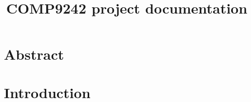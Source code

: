\documentclass[a4paper, 11pt]{report}
\title{COMP9242 project documentation}
\begin{document}
\maketitle
\chapter{Abstract}
\tableofcontents
\chapter{Introduction}
\end{document}
